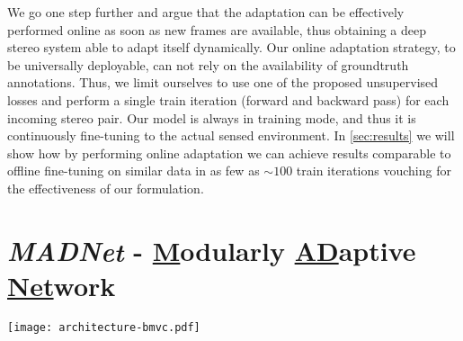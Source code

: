 \documentclass[10pt,twocolumn,letterpaper]{article}
\def\netname{\emph{MADNet}}
\def\extendednetname{\underline{M}odularly \underline{AD}aptive \underline{Net}work}
\begin{document}
We go one step further and argue that the adaptation can be effectively performed online as soon as new frames are available, thus obtaining a deep stereo system able to adapt itself dynamically. Our online adaptation strategy, to be universally deployable,  can not rely on the availability of groundtruth annotations. Thus, we limit ourselves to use one of the proposed unsupervised losses and perform a single train iteration (forward and backward pass) for each incoming stereo pair. Our model is always in training mode, and thus it is continuously fine-tuning to the actual sensed environment. In \autoref{sec:results} we will show how by performing online adaptation we can achieve results comparable to offline fine-tuning on similar data in as few as $\sim100$ train iterations vouching for the effectiveness of our formulation. 

\section{\netname{} - \extendednetname{}}
\label{sec:network}

\begin{figure*}[t]
	\centering
	\texttt{[image: architecture-bmvc.pdf]}
	\caption{Schematic description of the proposed \netname{} architecture (a), each circle between an $F_k$ and the corresponding $D_k$ representing a warp and correlation layer (b).}
	\label{fig:architecture}
\end{figure*}
\end{document}
